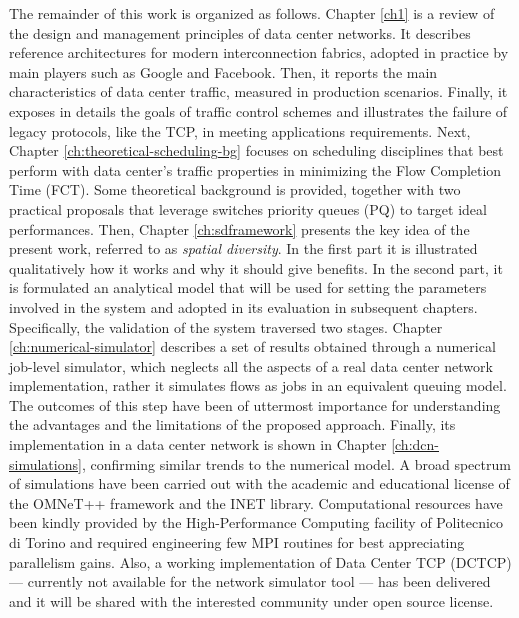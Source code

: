 The remainder of this work is organized as follows. Chapter \ref{ch1} is a review of the design and management principles of data center networks. It describes reference architectures for modern interconnection fabrics, adopted in practice by main players such as Google and Facebook. Then, it reports the main characteristics of data center traffic, measured in production scenarios. Finally, it exposes in details the goals of traffic control schemes and illustrates the failure of legacy protocols, like the TCP, in meeting applications requirements. Next, Chapter \ref{ch:theoretical-scheduling-bg} focuses on scheduling disciplines that best perform with data center's traffic properties in minimizing the Flow Completion Time (FCT). Some theoretical background is provided, together with two practical proposals that leverage switches priority queues (PQ) to target ideal performances. Then, Chapter \ref{ch:sdframework} presents the key idea of the present work, referred to as \emph{spatial diversity}. In the first part it is illustrated qualitatively how it works and why it should give benefits. In the second part, it is formulated an analytical model that will be used for setting the parameters involved in the system and adopted in its evaluation in subsequent chapters. Specifically, the validation of the system traversed two stages. Chapter \ref{ch:numerical-simulator} describes a set of results obtained through a numerical job-level simulator, which neglects all the aspects of a real data center network implementation, rather it simulates flows as jobs in an equivalent queuing model. The outcomes of this step have been of uttermost importance for understanding the advantages and the limitations of the proposed approach. Finally, its implementation in a data center network is shown in Chapter \ref{ch:dcn-simulations}, confirming similar trends to the numerical model. A broad spectrum of simulations have been carried out with the academic and educational license of the OMNeT++ framework and the INET library. Computational resources have been kindly provided by the High-Performance Computing facility of Politecnico di Torino and required engineering few MPI routines for best appreciating parallelism gains. Also, a working implementation of Data Center TCP (DCTCP) --- currently not available for the network simulator tool ---  has been delivered and it will be shared with the interested community under open source license.
